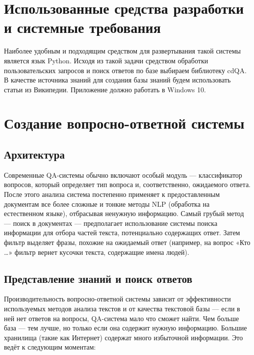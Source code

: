 \documentclass[a4paper,12pt,preview]{report} %
\begin{document}
	\chapter{Использованные средства разработки и системные требования}
	
	Наиболее удобным и подходящим средством для развертывания такой системы является язык Python. Исходя из такой задачи средством обработки пользовательских запросов и поиск ответов по базе выбираем библиотеку cdQA. В качестве источника знаний для создания базы знаний будем использовать статьи из Википедии.
	Приложение должно работать в Windows 10.
	
	\chapter{Создание вопросно-ответной системы}
	
	\section{Архитектура}
	
	Современные QA-системы обычно включают особый модуль — классификатор вопросов, который определяет тип вопроса и, соответственно, ожидаемого ответа. После этого анализа система постепенно применяет к предоставленным документам все более сложные и тонкие методы NLP (обработка на естественном языке), отбрасывая ненужную информацию. Самый грубый метод — поиск в документах — предполагает использование системы поиска информации для отбора частей текста, потенциально содержащих ответ. Затем фильтр выделяет фразы, похожие на ожидаемый ответ (например, на вопрос «Кто …» фильтр вернет кусочки текста, содержащие имена людей). 
	
	\section{Представление знаний и поиск ответов}
	
	Производительность вопросно-ответной системы зависит от эффективности используемых методов анализа текстов и от качества текстовой базы — если в ней нет ответов на вопросы, QA-система мало что сможет найти. Чем больше база — тем лучше, но только если она содержит нужную информацию. Большие хранилища (такие как Интернет) содержат много избыточной информации. Это ведёт к следующим моментам:
	
\end{document}
